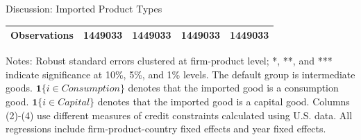 \documentclass[10pt]{beamer}
\begin{document}
\begin{frame}[label=discussion_product]{Discussion: Imported Product Types}
\begin{table}[H]
{\begin{threeparttable}
\begin{tabular}{lcccc}
			Observations & 1449033  & 1449033 & 1449033 & 1449033 \\
			\bottomrule
		\end{tabular}
		\begin{tablenotes}
			\footnotesize
			\item Notes: Robust standard errors clustered at firm-product level; *, **, and *** indicate significance at 10\%, 5\%, and 1\% levels. The default group is intermediate goods. $\mathbf{1}\{i \in Consumption\}$ denotes that the imported good is a consumption good. $\mathbf{1}\{i \in Capital\}$ denotes that the imported good is a capital good. Columns (2)-(4) use different measures of credit constraints calculated using U.S. data. All regressions include firm-product-country fixed effects and year fixed effects.
		\end{tablenotes}
	\end{threeparttable}
        }
	\label{tab.intermediate}
    \end{table}
    \hyperlink{tab.rauch}{}
\end{frame}
\end{document}
